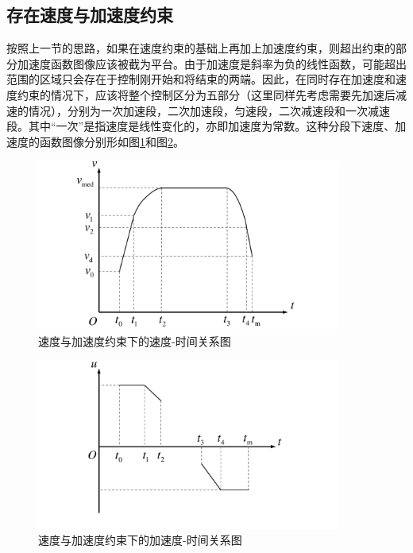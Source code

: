 \subsection{存在速度与加速度约束}
按照上一节的思路，如果在速度约束的基础上再加上加速度约束，则超出约束的部分加速度函数图像应该被截为平台。由于加速度是斜率为负的线性函数，可能超出范围的区域只会存在于控制刚开始和将结束的两端。因此，在同时存在加速度和速度约束的情况下，应该将整个控制区分为五部分（这里同样先考虑需要先加速后减速的情况），分别为一次加速段，二次加速段，匀速段，二次减速段和一次减速段。其中“一次”是指速度是线性变化的，亦即加速度为常数。这种分段下速度、加速度的函数图像分别形如图\ref{fig:ucv}和图\ref{fig:ucu}。
\begin{figure}[htbp]
\centering
\includegraphics[width=10cm]{figures/ucv.pdf}
\caption{速度与加速度约束下的速度-时间关系图}
\label{fig:ucv}
\end{figure}
\begin{figure}[htbp]
\centering
\includegraphics[width=10cm]{figures/ucu.pdf}
\caption{速度与加速度约束下的加速度-时间关系图}
\label{fig:ucu}
\end{figure}

